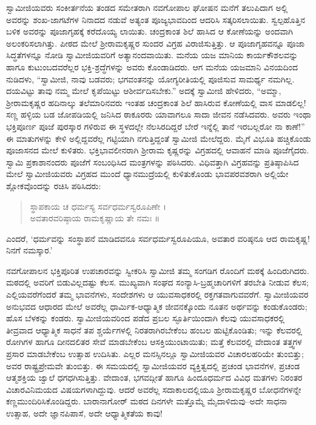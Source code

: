 ಸ್ವಾಮೀಜಿಯವರು ಸಂಕೀರ್ತನೆಯ ತಂಡದ ಸಮೇತರಾಗಿ ನವಗೋಪಾಲ ಘೋಷನ ಮನೆಗೆ ತಲುಪಿದಾಗ ಅಲ್ಲಿ ಅವರನ್ನು ಶಂಖ-ಜಾಗಟೆಗಳ ನಿನಾದದ ನಡುವೆ ಅತ್ಯಂತ ಪೂಜ್ಯಭಾವದಿಂದ ಆದರಿಸಿ ಸತ್ಕರಿಸಲಾಯಿತು. ಸ್ವಲ್ಪಹೊತ್ತಿನ ಬಳಿಕ ಅವರನ್ನು ಪೂಜಾಗೃಹಕ್ಕೆ ಕರೆದೊಯ್ಯ ಲಾಯಿತು. ಚಂದ್ರಕಾಂತ ಶಿಲೆ ಹಾಸಿದ ಆ ಕೋಣೆಯನ್ನು ಅಂದವಾಗಿ ಅಲಂಕರಿಸಲಾಗಿತ್ತು. ಪೀಠದ ಮೇಲೆ ಶ್ರೀರಾಮಕೃಷ್ಣರ ಸುಂದರ ವಿಗ್ರಹ ವಿರಾಜಿಸುತ್ತಿತ್ತು. ಆ ಪೂಜಾಗೃಹವನ್ನೂ ಪೂಜಾ ಸಿದ್ಧತೆಗಳನ್ನೂ ನೋಡಿ ಸ್ವಾಮೀಜಿಯವರಿಗೆ ಅತ್ಯಾನಂದವಾಯಿತು. ಮನೆಯ ಯಜ ಮಾನಿಯ ಕಾರ್ಯಕೌಶಲವನ್ನು ಹಾಗೂ ಕುಟುಂಬದವರೆಲ್ಲರ ಭಕ್ತಿ-ಶ್ರದ್ಧೆಗಳನ್ನು ಅವರು ಕೊಂಡಾಡಿದರು. ಆಗ ಮನೆಯ ಯಜಮಾನಿ ವಿನಯದಿಂದ ನುಡಿದಳು, “ಸ್ವಾಮೀಜಿ, ನಾವು ಬಡವರು; ಭಗವಂತನನ್ನು ಯೋಗ್ಯರೀತಿಯಲ್ಲಿ ಪೂಜಿಸುವ ಸಾಮರ್ಥ್ಯ ನಮಗಿಲ್ಲ. ದಯವಿಟ್ಟು ತಾವು ನಮ್ಮ ಮೇಲೆ ಕೃಪೆಯಿಟ್ಟು ಆಶೀರ್ವದಿಸಬೇಕು.” ಅದಕ್ಕೆ ಸ್ವಾಮೀಜಿ ಹೇಳಿದರು, “ಅಮ್ಮಾ, ಶ್ರೀರಾಮಕೃಷ್ಣರ ಹದಿನಾಲ್ಕು ತಲೆಮಾರಿನವರು ಇಂತಹ ಚಂದ್ರಕಾಂತ ಶಿಲೆ ಹಾಸಿರುವ ಕೋಣೆಯಲ್ಲಿ ವಾಸ ಮಾಡಲಿಲ್ಲ! ಸಣ್ಣ ಹಳ್ಳಿಯ ಬಡ ಜೋಪಡಿಯಲ್ಲಿ ಜನಿಸಿದ ಠಾಕೂರರು ಯಾವಾಗಲೂ ಸಾದಾ ಜೀವನ ನಡೆಸಿದವರು. ಅವರು ಇಂಥಾ ಭಕ್ತಿಪೂರ್ಣ ಪೂಜೆ ಪುರಸ್ಕಾರ ಗಳಿರುವ ಈ ಸ್ಥಳದಲ್ಲೇ ನೆಲಸಿರದಿದ್ದರೆ ಬೇರೆ ಇನ್ನೆಲ್ಲಿ ತಾನೆ ಇರಬಲ್ಲರೋ ನಾ ಕಾಣೆ!” ಈ ಮಾತುಗಳನ್ನು ಕೇಳಿ ಅಲ್ಲಿದ್ದವರೆಲ್ಲ ಗಟ್ಟಿಯಾಗಿ ನಗುತ್ತಿದ್ದಂತೆ ಸ್ವಾಮೀಜಿ ಮೇಲೆದ್ದರು. ಮೈಗೆ ವಿಭೂತಿ ಹಚ್ಚಿಕೊಂಡು ಪೂಜಾಸನದ ಮೇಲೆ ಕುಳಿತರು. ಭಕ್ತಿಭಾವಲೀನರಾಗಿ ಶ್ರೀರಾಮ ಕೃಷ್ಣರನ್ನು ವಿಗ್ರಹದಲ್ಲಿ ಆವಾಹನೆ ಮಾಡಿ ಪೂಜೆಗೈದರು. ಸ್ವಾಮಿ ಪ್ರಕಾಶಾನಂದರು ಪೂಜೆಗೆ ಸಂಬಂಧಿಸಿದ ಮಂತ್ರಗಳನ್ನು ಪಠಿಸಿದರು. ವಿಧಿವತ್ತಾಗಿ ವಿಗ್ರಹವನ್ನು ಪ್ರತಿಷ್ಠಾಪಿಸಿದ ಮೇಲೆ ಸ್ವಾಮೀಜಿಯವರು ವಿಗ್ರಹದ ಮುಂದೆ ಧ್ಯಾನಮುದ್ರೆಯಲ್ಲಿ ಕುಳಿತುಕೊಂಡು ಭಾವಪರವಶರಾಗಿ ಅಲ್ಲಿಯೇ ಶ್ಲೋಕವೊಂದನ್ನು ರಚಿಸಿ ಪಠಿಸಿದರು:

\begin{verse}
ಸ್ಥಾಪಕಾಯ ಚ ಧರ್ಮಸ್ಯ ಸರ್ವಧರ್ಮಸ್ವರೂಪಿಣೇ ।\\ಅವತಾರವರಿಷ್ಠಾಯ ರಾಮಕೃಷ್ಣಾಯ ತೇ ನಮಃ ॥
\end{verse}

\noindent

ಎಂದರೆ, ‘ಧರ್ಮವನ್ನು ಸಂಸ್ಥಾಪನೆ ಮಾಡಿದವನೂ ಸರ್ವಧರ್ಮಸ್ವರೂಪಿಯೂ, ಅವತಾರ ವರಿಷ್ಠನೂ ಆದ ರಾಮಕೃಷ್ಣ! ನಿನಗೆ ನಮಸ್ಕಾರ.’

ನವಗೋಪಾಲನ ಭಕ್ತಿಪೂರಿತ ಉಪಚಾರವನ್ನು ಸ್ವೀಕರಿಸಿ ಸ್ವಾಮೀಜಿ ತಮ್ಮ ಸಂಗಡಿಗ ರೊಂದಿಗೆ ಮಠಕ್ಕೆ ಹಿಂದಿರುಗಿದರು. ಮಠದಲ್ಲಿ ಅವರಿಗೆ ಬಿಡುವಿಲ್ಲದಷ್ಟು ಕೆಲಸ. ಮುಖ್ಯವಾಗಿ ಸಂಘದ ಸಂನ್ಯಾಸಿ-ಬ್ರಹ್ಮಚಾರಿಗಳಿಗೆ ತರಬೇತಿ ನೀಡುವ ಕೆಲಸ; ಎಲ್ಲಿಯವರೆಗೆಂದರೆ ತಮ್ಮ ಭಾವನೆಗಳು, ಸಂದೇಶಗಳು ಆ ಯುವಸಾಧಕರಲ್ಲಿ ರಕ್ತಗತವಾಗುವವರೆಗೆ. ಸ್ವಾಮೀಜಿಯವರ ಅನುಭವದ ಆಧಾರದ ಮೇಲೆ ಅವರೆಲ್ಲ ಧಾರ್ಮಿಕ-ಆಧ್ಯಾತ್ಮಿಕ ಜೀವನಕ್ಕೊಂದು ನೂತನ ಅರ್ಥವನ್ನು ಕಂಡುಕೊಂಡರು; ಹೊಸ ಬೆಳಕನ್ನು ಕಂಡರು. ಸ್ವಾಮೀಜಿಯವರಿಂದ ಪಡೆದ ಪ್ರಬಲ ಸ್ಫೂರ್ತಿಯಿಂದಾಗಿ ಕೆಲವು ಯುವಸಾಧಕರಲ್ಲಿ ತೀವ್ರವಾದ ಆಧ್ಯಾತ್ಮಿಕ ಸಾಧನೆ ತಪ ಶ್ಚರ್ಯೆಗಳಲ್ಲಿ ನಿರತರಾಗಿರಬೇಕೆಂಬ ಹಂಬಲ ಹುಟ್ಟಿಕೊಂಡಿತು; ಇನ್ನು ಕೆಲವರಲ್ಲಿ ರೋಗಿಗಳ ಹಾಗೂ ದೀನದಲಿತರ ಸೇವೆ ಮಾಡಬೇಕೆಂಬ ಆಸಕ್ತಿಯುಂಟಾಯಿತು; ಮತ್ತೆ ಕೆಲವರಲ್ಲಿ ವೇದಾಂತ ತತ್ತ್ವಗಳ ಪ್ರಸಾರ ಮಾಡಬೇಕೆಂಬ ಉತ್ಸಾಹ ಉದಿಸಿತು. ಎಲ್ಲರ ಮನಸ್ಸಿನಲ್ಲೂ ಸ್ವಾಮೀಜಿಯವರ ವಿಚಾರಲಹರಿಯೇ ತುಂಬಿತ್ತು; ಅವರ ರಾಷ್ಟ್ರಪ್ರೇಮವೇ ತುಂಬಿತ್ತು. ಈ ಸಮಯದಲ್ಲಿ ಸ್ವಾಮೀಜಿಯವರ ವ್ಯಕ್ತಿತ್ವದಲ್ಲಿ ಪ್ರಚಂಡ ಭಾವನೆಗಳ, ಪ್ರಚಂಡ ಆತ್ಮಶಕ್ತಿಯ ಜ್ವಾಲೆ ಧಗಧಗಿಸುತ್ತಿತ್ತು. ವೇದಾಂತ, ಭಗವದ್ಗೀತೆ ಹಾಗೂ ಹಿಂದೂಧರ್ಮದ ವಿವಿಧ ಮತಗಳು ನಿರಂತರ ವಿಚಾರವಿನಿಮಯದ ವಿಷಯಗಳಾಗಿದ್ದುವು. ಆದರೆ ಅವರೆಲ್ಲ ಸದಾಕಾಲದಲ್ಲಿಯೂ ಶ್ರೀರಾಮಕೃಷ್ಣರ ಬೋಧನೆಗಳನ್ನೇ ಕಣ್ಣಮುಂದಿರಿಸಿಕೊಂಡಿದ್ದರು. ಬಾರಾನಾಗೋರ್ ಮಠದ ದಿನಗಳೇ ಮತ್ತೊಮ್ಮೆ ಮೈದಾಳಿದುವು–ಅದೇ ಸಾಧನಾ ಉತ್ಸಾಹ, ಅದೇ ಜ್ಞಾನಪಿಪಾಸೆ, ಅದೇ ಆಧ್ಯಾತ್ಮಿಕತೆಯ ಕಾವು!

